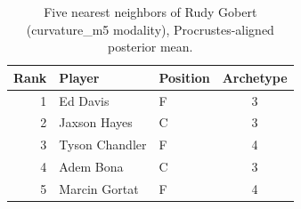 \begin{table}[htbp]
  \centering\small
  \begin{tabular}{rllc}
    \toprule
    Rank & Player & Position & Archetype \\
    \midrule
    1 & Ed Davis & F & 3 \\
    2 & Jaxson Hayes & C & 3 \\
    3 & Tyson Chandler & F & 4 \\
    4 & Adem Bona & C & 3 \\
    5 & Marcin Gortat & F & 4 \\
    \bottomrule
  \end{tabular}
  \caption{Five nearest neighbors of Rudy Gobert (curvature_m5 modality), Procrustes-aligned posterior mean.}
  \label{tab:Rudy_Gobert_neighbors_curvature_m5}
\end{table}

